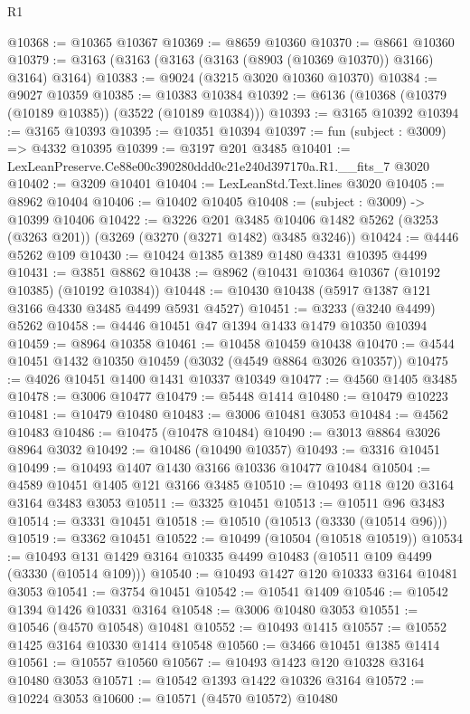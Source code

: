 \begin{lexlean}{R1}
\begin{coremodule}
@10368 := @10365 @10367
@10369 := @8659 @10360
@10370 := @8661 @10360
@10379 := @3163 (@3163 (@3163 (@3163 (@8903 (@10369 @10370)) @3166) @3164) @3164)
@10383 := @9024 (@3215 @3020 @10360 @10370)
@10384 := @9027 @10359
@10385 := @10383 @10384
@10392 := @6136 (@10368 (@10379 (@10189 @10385)) (@3522 (@10189 @10384)))
@10393 := @3165 @10392
@10394 := @3165 @10393
@10395 := @10351 @10394
@10397 := fun (subject : @3009) => @4332 @10395
@10399 := @3197 @201 @3485
@10401 := LexLeanPreserve.Ce88e00c390280ddd0c21e240d397170a.R1.__fits_7 @3020
@10402 := @3209 @10401
@10404 := LexLeanStd.Text.lines @3020
@10405 := @8962 @10404
@10406 := @10402 @10405
@10408 := (subject : @3009) -> @10399 @10406
@10422 := @3226
    @201
    @3485
    @10406
    @1482
    @5262
    (@3253 (@3263 @201))
    (@3269 (@3270 (@3271 @1482) @3485 @3246))
@10424 := @4446 @5262 @109
@10430 := @10424 @1385 @1389 @1480 @4331 @10395 @4499
@10431 := @3851 @8862
@10438 := @8962 (@10431 @10364 @10367 (@10192 @10385) (@10192 @10384))
@10448 := @10430 @10438 (@5917 @1387 @121 @3166 @4330 @3485 @4499 @5931 @4527)
@10451 := @3233 (@3240 @4499) @5262
@10458 := @4446 @10451 @47 @1394 @1433 @1479 @10350 @10394
@10459 := @8964 @10358
@10461 := @10458 @10459 @10438
@10470 := @4544 @10451 @1432 @10350 @10459 (@3032 (@4549 @8864 @3026 @10357))
@10475 := @4026 @10451 @1400 @1431 @10337 @10349
@10477 := @4560 @1405 @3485
@10478 := @3006 @10477
@10479 := @5448 @1414
@10480 := @10479 @10223
@10481 := @10479 @10480
@10483 := @3006 @10481 @3053
@10484 := @4562 @10483
@10486 := @10475 (@10478 @10484)
@10490 := @3013 @8864 @3026 @8964 @3032
@10492 := @10486 (@10490 @10357)
@10493 := @3316 @10451
@10499 := @10493 @1407 @1430 @3166 @10336 @10477 @10484
@10504 := @4589 @10451 @1405 @121 @3166 @3485
@10510 := @10493 @118 @120 @3164 @3164 @3483 @3053
@10511 := @3325 @10451
@10513 := @10511 @96 @3483
@10514 := @3331 @10451
@10518 := @10510 (@10513 (@3330 (@10514 @96)))
@10519 := @3362 @10451
@10522 := @10499 (@10504 (@10518 @10519))
@10534 := @10493 @131 @1429 @3164 @10335 @4499 @10483 (@10511 @109 @4499 (@3330 (@10514 @109)))
@10540 := @10493 @1427 @120 @10333 @3164 @10481 @3053
@10541 := @3754 @10451
@10542 := @10541 @1409
@10546 := @10542 @1394 @1426 @10331 @3164
@10548 := @3006 @10480 @3053
@10551 := @10546 (@4570 @10548) @10481
@10552 := @10493 @1415
@10557 := @10552 @1425 @3164 @10330 @1414 @10548
@10560 := @3466 @10451 @1385 @1414
@10561 := @10557 @10560
@10567 := @10493 @1423 @120 @10328 @3164 @10480 @3053
@10571 := @10542 @1393 @1422 @10326 @3164
@10572 := @10224 @3053
@10600 := @10571
    (@4570 @10572)
    @10480

\end{coremodule}
\end{lexlean}
